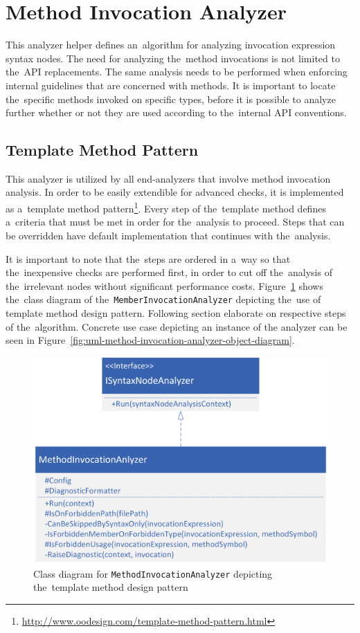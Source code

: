 \documentclass[
  digital, %
  table,   %
  lof,     %
  lot,     %
  oneside,
]{fithesis3}
\begin{document}
\section{Method Invocation Analyzer}
This analyzer helper defines an~algorithm for analyzing invocation expression syntax nodes. The need for analyzing the~method invocations is not limited to the~API replacements. The same analysis needs to be performed when enforcing internal guidelines that are concerned with methods. It is important to locate the~specific methods invoked on specific types, before it is possible to analyze further whether or not they are used according to the~internal API conventions. 

\subsection{Template Method Pattern}
This analyzer is utilized by all end-analyzers that involve method invocation analysis. In order to be easily extendible for advanced checks, it is implemented as a~template method pattern\footnote{\url{http://www.oodesign.com/template-method-pattern.html}}. Every step of the~template method defines a~criteria that must be met in order for the~analysis to proceed. Steps that can be overridden have default implementation that continues with the~analysis. 

It is important to note that the~steps are ordered in a~way so that the~inexpensive checks are performed first, in order to cut off the~analysis of the~irrelevant nodes without significant performance costs. Figure~\ref{fig:uml-method-invocation-analyzer} shows the~class diagram of the~\texttt{MemberInvocationAnalyzer} depicting the~use of template method design pattern. Following section elaborate on respective steps of the~algorithm. Concrete use case depicting an instance of the analyzer can be seen in Figure~\ref{fig:uml-method-invocation-analyzer-object-diagram}.  

\begin{figure}[h!]
		\centering
			\includegraphics[scale=0.85]{img/uml/method-invocation-analyzer}
		\caption{Class diagram for \texttt{MethodInvocationAnalyzer} depicting the~template method design pattern}
		\label{fig:uml-method-invocation-analyzer}
\end{figure}
\end{document}
